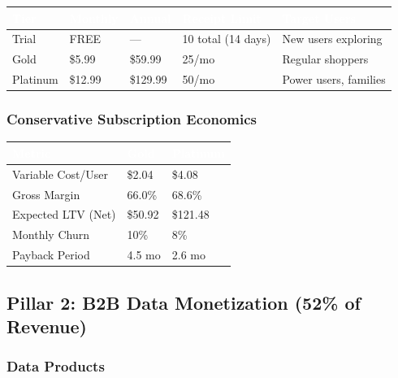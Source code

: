 \documentclass[11pt,a4paper]{article}
\begin{document}
\begin{center}
\begin{tabular}{L{2.5cm} R{2cm} R{2cm} C{3cm} L{3cm}}
    \toprule
    \textcolor{white}{\textbf{Tier}} & \textcolor{white}{\textbf{Monthly}} & \textcolor{white}{\textbf{Annual}} & \textcolor{white}{\textbf{Receipt Limit}} & \textcolor{white}{\textbf{Target Users}}\\
    \midrule
     Trial & FREE & --- & 10 total (14 days) & New users exploring\\
     Gold & \$5.99 & \$59.99 & 25/mo & Regular shoppers\\
     Platinum & \$12.99 & \$129.99 & 50/mo & Power users, families\\
    \bottomrule
\end{tabular}
\end{center}

\subsubsection{Conservative Subscription Economics}

\begin{center}
\begin{tabular}{L{4cm} R{3cm} R{3cm}}
    \toprule
    \textcolor{white}{\textbf{Metric}} & \textcolor{white}{\textbf{Gold}} & \textcolor{white}{\textbf{Platinum}}\\
    \midrule
    Variable Cost/User & \$2.04 & \$4.08\\
    Gross Margin & 66.0\% & 68.6\%\\
    Expected LTV (Net) & \$50.92 & \$121.48\\
    Monthly Churn & 10\% & 8\%\\
    Payback Period & 4.5 mo & 2.6 mo\\
    \bottomrule
\end{tabular}
\end{center}

\subsection{Pillar 2: B2B Data Monetization (52\% of Revenue)}

\subsubsection{Data Products}
\end{document}
